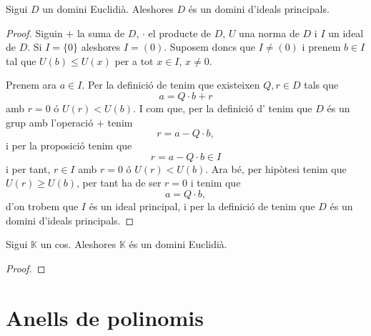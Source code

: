 \documentclass[../Apunts.tex]{subfiles}
\begin{document}
	\begin{theorem}
		Sigui \(D\) un domini Euclidià. Aleshores \(D\) és un domini d'ideals principals.
		\begin{proof}
			Siguin \(+\) la suma de \(D\), \(\cdot\) el producte de \(D\), \(U\) una norma de \(D\) i \(I\) un ideal de \(D\). Si \(I=\{0\}\) aleshores \(I=(0)\). Suposem doncs que \(I\neq(0)\) i prenem \(b\in I\) tal que \(U(b)\leq U(x)\) per a tot \(x\in I\), \(x\neq0\).
			
			Prenem ara \(a\in I\). Per la definició de  tenim que existeixen \(Q,r\in D\) tals que
			\[a=Q\cdot b+r\]
			amb \(r=0\) ó \(U(r)<U(b)\). I com que, per la definició d' tenim que \(D\) és un grup amb l'operació \(+\) tenim
			\[r=a-Q\cdot b,\]
			i per la proposició  tenim que
			\[r=a-Q\cdot b\in I\]
			i per tant, \(r\in I\) amb \(r=0\) ó \(U(r)<U(b)\). Ara bé, per hipòtesi tenim que \(U(r)\geq U(b)\), per tant ha de ser \(r=0\) i tenim que
			\[a=Q\cdot b,\]
			d'on trobem que \(I\) és un ideal principal, i per la definició de  tenim que \(D\) és un domini d'ideals principals.
		\end{proof}
	\end{theorem}
	\begin{theorem}
		Sigui \(\mathbb{K}\) un cos. Aleshores \(\mathbb{K}\) és un domini Euclidià.
		\begin{proof}
		\end{proof}
	\end{theorem}
	\section{Anells de polinomis}
\end{document}
